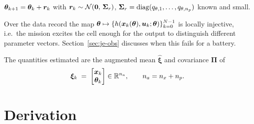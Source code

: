 \begin{assumption}\label{as:je-rw}
$\bm{\theta}_{k+1}=\bm{\theta}_k+\bm{r}_k$ with $\bm{r}_k\sim\mathcal{N}\!\left(\bm{0},\,\bm{\Sigma}_r\right)$,
$\bm{\Sigma}_r=\operatorname{diag}(q_{\theta,1},\dots,q_{\theta,n_p})$ known and small.
\end{assumption}

\begin{assumption}[Identifiability]\label{as:je-ident}
Over the data record the map $\bm{\theta}\mapsto\{h(\bm{x}_k(\bm{\theta}),\bm{u}_k;\bm{\theta})\}_{k=0}^{N-1}$ is
locally injective, i.e.\ the mission excites the cell enough for the output to distinguish
different parameter vectors.  Section~\ref{sec:je-obs} discusses when this fails for a battery.
\end{assumption}

The quantities estimated are the augmented mean $\hat{\bm{\xi}}$ and covariance $\bm{\Pi}$ of
\begin{equation}
\bm{\xi}_k \;=\; \begin{bmatrix}\bm{x}_k\\ \bm{\theta}_k\end{bmatrix}\in\mathbb{R}^{n_a},\qquad n_a=n_x+n_p .
\label{eq:je-aug}
\end{equation}

\section{Derivation}

